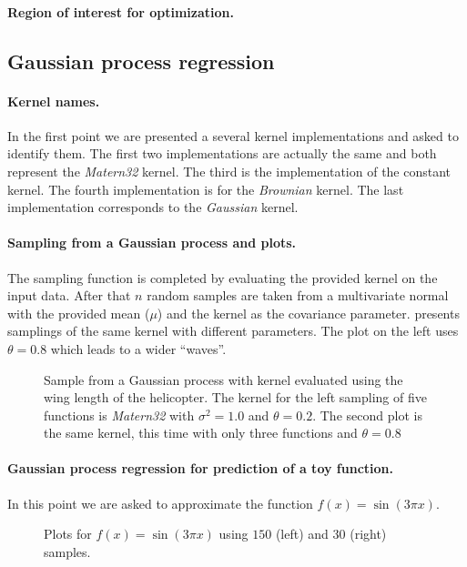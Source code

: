 \paragraph{Region of interest for optimization.}

\subsection{Gaussian process regression}

\paragraph{Kernel names.} In the first point we are presented a several kernel
implementations and asked to identify them. The first two implementations are
actually the same and both represent the \emph{Matern32} kernel. The third is
the implementation of the constant kernel. The fourth implementation is for the
\emph{Brownian} kernel. The last implementation corresponds to the
\emph{Gaussian} kernel.

\paragraph{Sampling from a Gaussian process and plots.}
The sampling function is completed by evaluating the provided kernel on the
input data. After that $n$ random samples are taken from a multivariate normal
with the provided mean ($\mu$) and the kernel as the covariance parameter.
 presents samplings of the same kernel with different
parameters. The plot on the left uses $\theta=0.8$ which leads to a wider
``waves''.
\begin{figure}
  \centering
  
  \caption{Sample from a Gaussian process with kernel evaluated using the wing
  length of the helicopter. The kernel for the left sampling of five functions
  is \emph{Matern32} with $\sigma^2=1.0$ and $\theta=0.2$. The second plot is
  the same kernel, this time with only three functions and $\theta=0.8$}
  \label{fig_gpsamples}
\end{figure}

\paragraph{Gaussian process regression for prediction of a toy function.} In
this point we are asked to approximate the function $f(x) = \sin(3\pi x)$.

\begin{figure}
  \centering
  
  \caption{Plots for $f(x) = \sin(3\pi x)$ using $150$ (left) and $30$ (right)
  samples.}
  \label{fig_gpsamples}
\end{figure}

